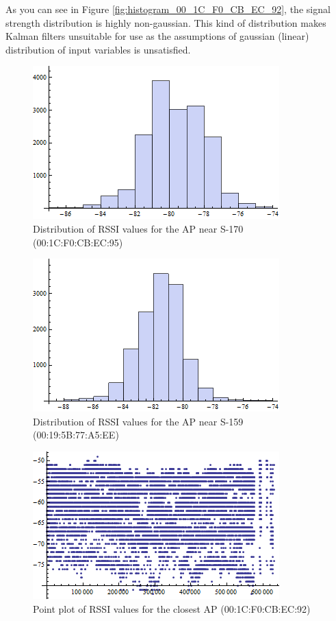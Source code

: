 As you can see in Figure \ref{fig:histogram_00_1C_F0_CB_EC_92}, the signal strength
distribution is highly non-gaussian. This kind of distribution makes Kalman filters
unsuitable for use as the assumptions of gaussian (linear) distribution of 
input variables is unsatisfied.

\begin{figure}\centering
    \includegraphics{figures/histogram_00_1C_F0_CB_EC_95.png}
    \caption{Distribution of RSSI values for the AP near S-170 (00:1C:F0:CB:EC:95) \label{fig:histogram_00_1C_F0_CB_EC_95}}
\end{figure}

\begin{figure}\centering
    \includegraphics{figures/histogram_00_19_5B_77_A5_EE.png}
    \caption{Distribution of RSSI values for the AP near S-159 (00:19:5B:77:A5:EE) \label{fig:histogram_00_19_5B_77_A5_EE}}
\end{figure}

\begin{figure}\centering
    \includegraphics{figures/listplot_00_1C_F0_CB_EC_92.png}
    \caption{Point plot of RSSI values for the closest AP (00:1C:F0:CB:EC:92) \label{fig:listplot_00_1C_F0_CB_EC_92}}    
\end{figure}

